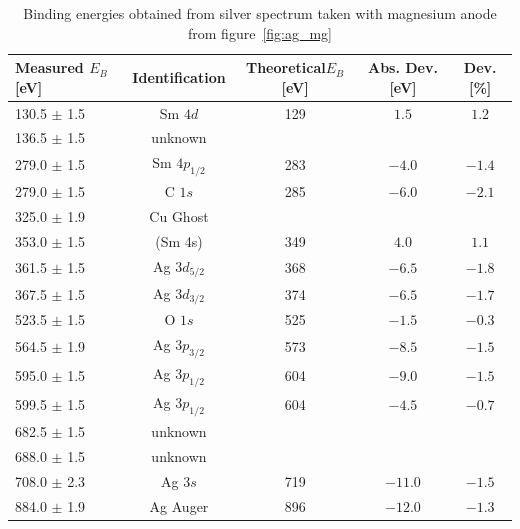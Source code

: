 \documentclass[a4paper,10pt]{scrartcl}
\begin{document}
\begin{table}[h]
\begin{center}
\begin{tabular}{lcccc}
\toprule
Measured $E_{B}$ [eV]        & Identification & Theoretical$E_{B}$ [eV] & Abs. Dev. [eV] & Dev. [\%]\\
\midrule
130.5 $\pm$ 1.5              & Sm $4d$        & 129                     & $1.5$          & $1.2$ \\
136.5 $\pm$ 1.5              & unknown        &                         &                &       \\
279.0 $\pm$ 1.5              & Sm $4p_{1/2}$  & 283                     & $-4.0$         & $-1.4$\\
279.0 $\pm$ 1.5              & C $1s$         & 285                     & $-6.0$         & $-2.1$\\
325.0 $\pm$ 1.9              & Cu Ghost       &                         &                &       \\
353.0 $\pm$ 1.5              & (Sm 4s)        & 349                     & $4.0$          & $1.1$ \\
361.5 $\pm$ 1.5              & Ag $3d_{5/2}$  & 368                     & $-6.5$         & $-1.8$\\
367.5 $\pm$ 1.5              & Ag $3d_{3/2}$  & 374                     & $-6.5$         & $-1.7$\\
523.5 $\pm$ 1.5              & O $1s$         & 525                     & $-1.5$         & $-0.3$\\
564.5 $\pm$ 1.9              & Ag $3p_{3/2}$  & 573                     & $-8.5$         & $-1.5$\\
595.0 $\pm$ 1.5              & Ag $3p_{1/2}$  & 604                     & $-9.0$         & $-1.5$\\
599.5 $\pm$ 1.5              & Ag $3p_{1/2}$  & 604                     & $-4.5$         & $-0.7$\\
682.5 $\pm$ 1.5              & unknown        &                         &                &       \\
688.0 $\pm$ 1.5              & unknown        &                         &                &       \\
708.0 $\pm$ 2.3              & Ag $3s$        & 719                     & $-11.0$        & $-1.5$\\
884.0 $\pm$ 1.9              & Ag Auger       & 896                     & $-12.0$        & $-1.3$\\
\bottomrule
\end{tabular}
\end{center}
\par
\caption{Binding energies obtained from silver spectrum taken with magnesium anode from figure~\ref{fig:ag_mg} \label{tab:ag_mg_ident}}
\end{table}
\end{document}
